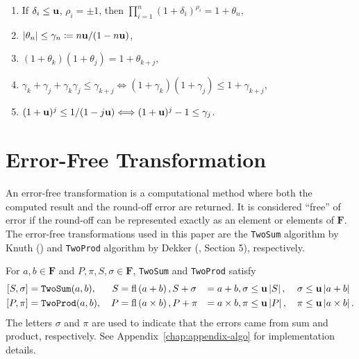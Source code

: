 \begin{enumerate}
  \item If \(\delta_i \leq \mathbf{u}\), \(\rho_i = \pm 1\), then
      \(\prod_{i = 1}^n (1 + \delta_i)^{\rho_i} = 1 + \theta_n\),
  \item \(\left|\theta_n\right| \leq \gamma_n \coloneqq
      n \mathbf{u} / (1 - n \mathbf{u})\),
  \item \((1 + \theta_k)(1 + \theta_j) = 1 + \theta_{k + j}\),
  \item \(\gamma_k + \gamma_j + \gamma_k \gamma_j \leq \gamma_{k + j}
    \Longleftrightarrow (1 + \gamma_k)(1 + \gamma_j) \leq 1 + \gamma_{k + j}\),
  \item \((1 + \mathbf{u})^j \leq 1 / (1 - j \mathbf{u}) \Longleftrightarrow
  (1 + \mathbf{u})^j - 1 \leq \gamma_j\).
\end{enumerate}

\section{Error-Free Transformation}

An error-free transformation is a computational method where both
the computed result and the round-off error are returned. It
is considered ``free'' of error if the round-off can be represented
exactly as an element or elements of \(\mathbf{F}\).
The error-free transformations used in this paper are
the \texttt{TwoSum} algorithm by Knuth (\cite{Knuth1997}) and
\texttt{TwoProd} algorithm by Dekker (\cite{Dekker1971}, Section 5),
respectively.

\begin{theorem}\label{thm:eft}
For \(a, b \in \mathbf{F}\) and \(P, \pi, S, \sigma \in \mathbf{F}\),
\texttt{TwoSum} and \texttt{TwoProd} satisfy
\begin{alignat}{4}
\left[S, \sigma\right] &= \mathtt{TwoSum}(a, b), & \, S &= \operatorname{fl}\left(a + b\right),
  S + \sigma &= a + b, \sigma &\leq \mathbf{u} \left|S\right|,
  & \, \sigma &\leq \mathbf{u} \left|a + b\right| \\
\left[P, \pi\right] &= \mathtt{TwoProd}(a, b),
  & \, P &= \operatorname{fl}\left(a \times b\right), P + \pi &= a \times b,
  \pi &\leq \mathbf{u} \left|P\right|,
  & \, \pi &\leq \mathbf{u} \left|a \times b\right|.
\end{alignat}
The letters \(\sigma\) and \(\pi\) are used to indicate that the
errors came from sum and product, respectively. See
Appendix~\ref{chap:appendix-algo} for implementation details.
\end{theorem}

